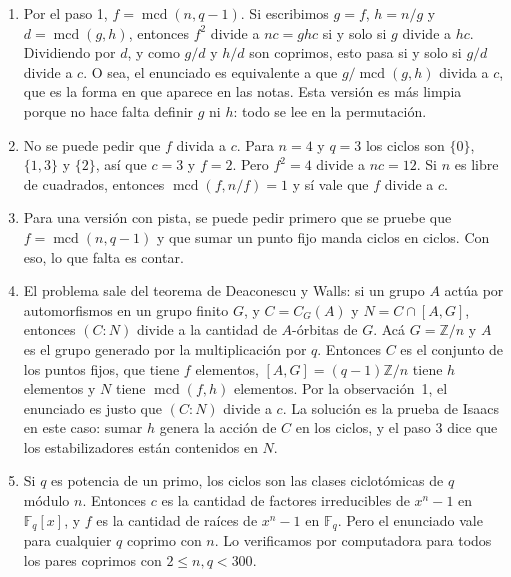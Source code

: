 \documentclass[11pt]{amsproc}
\newcommand{\mcd}{\operatorname{mcd}}
\begin{document}
\begin{enumerate}
  \item Por el paso 1, $f=\mcd(n,q-1)$. Si escribimos $g=f$, $h=n/g$ y
        $d=\mcd(g,h)$, entonces $f^2$ divide a $nc=ghc$ si y solo si $g$
        divide a $hc$. Dividiendo por $d$, y como $g/d$ y $h/d$ son
        coprimos, esto pasa si y solo si $g/d$ divide a $c$. O sea, el
        enunciado es equivalente a que $g/\mcd(g,h)$ divida a $c$, que es la
        forma en que aparece en las notas.
        Esta versión es más limpia porque no hace falta definir $g$ ni $h$:
        todo se lee en la permutación.

  \item No se puede pedir que $f$ divida a $c$. Para $n=4$ y $q=3$ los
        ciclos son $\{0\}$, $\{1,3\}$ y $\{2\}$, así que $c=3$ y $f=2$. Pero
        $f^2=4$ divide a $nc=12$. Si $n$ es libre de cuadrados, entonces
        $\mcd(f,n/f)=1$ y sí vale que $f$ divide a $c$.

  \item Para una versión con pista, se puede pedir primero que se pruebe que
        $f=\mcd(n,q-1)$ y que sumar un punto fijo manda ciclos en ciclos.
        Con eso, lo que falta es contar.

  \item El problema sale del teorema de Deaconescu y Walls: si un grupo $A$
        actúa por automorfismos en un grupo finito $G$, y $C=C_G(A)$ y
        $N=C\cap[A,G]$, entonces $(C:N)$ divide a la cantidad de $A$-órbitas
        de $G$. Acá $G=\mathbb{Z}/n$ y $A$ es el grupo generado por la
        multiplicación por $q$. Entonces $C$ es el conjunto de los puntos
        fijos, que tiene $f$ elementos, $[A,G]=(q-1)\mathbb{Z}/n$ tiene $h$
        elementos y $N$ tiene $\mcd(f,h)$ elementos. Por la observación~1, el enunciado es
        justo que $(C:N)$ divide a $c$. La solución es la prueba de Isaacs en
        este caso: sumar $h$ genera la acción de $C$ en los ciclos, y el
        paso 3 dice que los estabilizadores están contenidos en $N$.

  \item Si $q$ es potencia de un primo, los ciclos son las clases
        ciclotómicas de $q$ módulo $n$. Entonces $c$ es la cantidad de
        factores irreducibles de $x^n-1$ en $\mathbb{F}_q[x]$, y $f$ es la
        cantidad de raíces de $x^n-1$ en $\mathbb{F}_q$. Pero el enunciado
        vale para cualquier $q$ coprimo con $n$. Lo verificamos por
        computadora para todos los pares coprimos con $2\le n,q<300$.
\end{enumerate}
\end{document}
